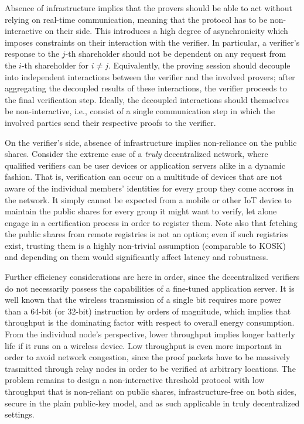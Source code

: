 \documentclass{iacrtrans}
\begin{document}
Absence of infrastructure implies that
the provers should be able to
act without relying on real-time communication,
meaning that the protocol has to be
non-interactive on their side.
This introduces a high degree of asynchronicity
which imposes constraints on their interaction
with the verifier.
In particular, a verifier's response
to the $j$-th shareholder should not be dependent
on any request from the $i$-th shareholder for $i \neq j$.
Equivalently, the proving session should decouple into
independent interactions between the verifier
and the involved provers; after aggregating
the decoupled results of these interactions, the verifier
proceeds to the final verification step.
Ideally, the decoupled interactions should themselves be
non-interactive, i.e., consist of a single communication
step in which the involved parties send their respective
proofs to the verifier.

On the verifier's side, absence of infrastructure
implies non-reliance on the public shares.
Consider the extreme case of a
\textit{truly} decentralized network,
where qualified verifiers can be user devices
or application servers alike in a dynamic fashion.
That is, verification can occur
on a multitude of devices that are not aware
of the individual members' identities for every group
they come accross in the network.
It simply cannot be expected from a mobile or other IoT device
to maintain the public shares for every group
it might want to verify,
let alone engage in a certification process
in order to register them.
Note also that fetching the public shares
from remote registries is not an option;
even if such registries exist,
trusting them is a highly non-trivial assumption
(comparable to KOSK)
and depending on them would significantly affect
latency and robustness.

Further efficiency considerations are here in order,
since the decentralized verifiers do not necessarily possess
the capabilities of a fine-tuned application server.
It is well known that the wireless transmission
of a single bit requires more power
than a 64-bit (or 32-bit) instruction by orders of magnitude,
which implies that throughput is
the dominating factor with respect to overall energy consumption.
From the individual node's perspective,
lower throughput implies longer batterly life
if it runs on a wireless device.
Low throughput is even more important
in order to avoid network congestion,
since the proof packets have to be massively trasmitted
through relay nodes
in order to be verified at arbitrary locations.
The problem remains to
design a non-interactive threshold protocol
with low throughput that is
non-reliant on public shares, infrastructure-free
on both sides, secure in the plain public-key model,
and as such applicable in truly decentralized settings.
\end{document}
